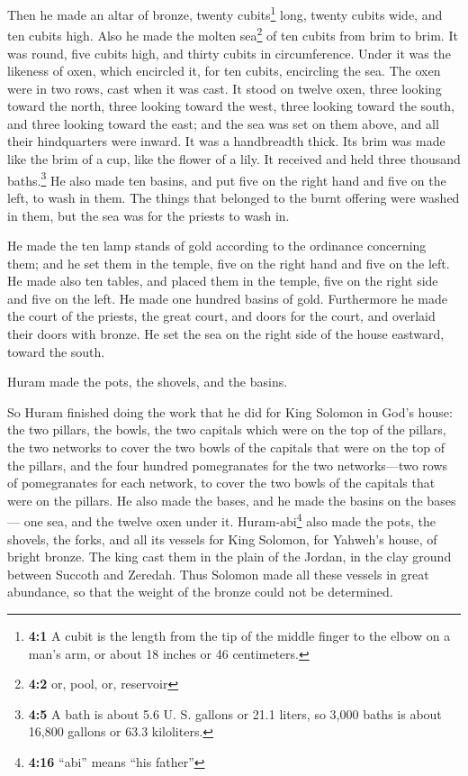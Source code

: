 \begin{paracol}{2}
\begin{otherlanguage}{english}
 Then he made an altar of bronze, twenty cubits\footnote{\textbf{4:1}
  A cubit is the length from the tip of the middle finger to the elbow
  on a man's arm, or about 18 inches or 46 centimeters.} long, twenty
cubits wide, and ten cubits high.  Also he made the molten
sea\footnote{\textbf{4:2} or, pool, or, reservoir} of ten cubits from
brim to brim. It was round, five cubits high, and thirty cubits in
circumference.  Under it was the likeness of oxen, which
encircled it, for ten cubits, encircling the sea. The oxen were in two
rows, cast when it was cast.  It stood on twelve oxen,
three looking toward the north, three looking toward the west, three
looking toward the south, and three looking toward the east; and the sea
was set on them above, and all their hindquarters were inward.
 It was a handbreadth thick. Its brim was made like the
brim of a cup, like the flower of a lily. It received and held three
thousand baths.\footnote{\textbf{4:5} A bath is about 5.6 U. S. gallons
  or 21.1 liters, so 3,000 baths is about 16,800 gallons or 63.3
  kiloliters.}  He also made ten basins, and put five on
the right hand and five on the left, to wash in them. The things that
belonged to the burnt offering were washed in them, but the sea was for
the priests to wash in.

 He made the ten lamp stands of gold according to the
ordinance concerning them; and he set them in the temple, five on the
right hand and five on the left.  He made also ten tables,
and placed them in the temple, five on the right side and five on the
left. He made one hundred basins of gold.  Furthermore he
made the court of the priests, the great court, and doors for the court,
and overlaid their doors with bronze.  He set the sea on
the right side of the house eastward, toward the south.

 Huram made the pots, the shovels, and the basins.

So Huram finished doing the work that he did for King Solomon in God's
house:  the two pillars, the bowls, the two capitals
which were on the top of the pillars, the two networks to cover the two
bowls of the capitals that were on the top of the pillars,
 and the four hundred pomegranates for the two
networks---two rows of pomegranates for each network, to cover the two
bowls of the capitals that were on the pillars.  He also
made the bases, and he made the basins on the bases--- 
one sea, and the twelve oxen under it. 
Huram-abi\footnote{\textbf{4:16} ``abi'' means ``his father''} also made
the pots, the shovels, the forks, and all its vessels for King Solomon,
for Yahweh's house, of bright bronze.  The king cast them
in the plain of the Jordan, in the clay ground between Succoth and
Zeredah.  Thus Solomon made all these vessels in great
abundance, so that the weight of the bronze could not be determined.


\end{otherlanguage}
\end{paracol}
